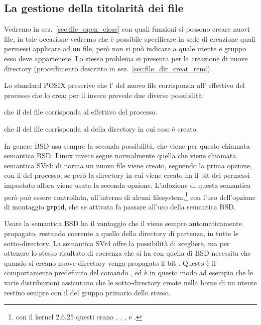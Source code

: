 

\subsection{La gestione della titolarità dei file}
\label{sec:file_ownership_management}

Vedremo in sez.~\ref{sec:file_open_close} con quali funzioni si possono creare
nuovi file, in tale occasione vedremo che è possibile specificare in sede di
creazione quali permessi applicare ad un file, però non si può indicare a
quale utente e gruppo esso deve appartenere.  Lo stesso problema si presenta
per la creazione di nuove directory (procedimento descritto in
sez.~\ref{sec:file_dir_creat_rem}).

Lo standard POSIX prescrive che l' del nuovo file corrisponda
all' effettivo del processo che lo crea; per il  invece
prevede due diverse possibilità:
\begin{itemize*}
\item che il  del file corrisponda al  effettivo del
  processo.
\item che il  del file corrisponda al  della directory in
  cui esso è creato.
\end{itemize*}

In genere BSD usa sempre la seconda possibilità, che viene per questo chiamata
semantica BSD. Linux invece segue normalmente quella che viene chiamata
semantica SVr4: di norma un nuovo file viene creato, seguendo la prima
opzione, con il  del processo, se però la directory in cui viene
creato ha il bit  dei permessi impostato allora viene usata la
seconda opzione. L'adozione di questa semantica però può essere controllata,
all'interno di alcuni filesystem,\footnote{con il kernel 2.6.25 questi erano
  , , , e .}  con l'uso dell'opzione di
montaggio \texttt{grpid}, che se attivata fa passare all'uso della semantica
BSD.

Usare la semantica BSD ha il vantaggio che il  viene sempre
automaticamente propagato, restando coerente a quello della directory di
partenza, in tutte le sotto-directory. La semantica SVr4 offre la possibilità
di scegliere, ma per ottenere lo stesso risultato di coerenza che si ha con
quella di BSD necessita che quando si creano nuove directory venga propagato
il bit . Questo è il comportamento predefinito del comando
, ed è in questo modo ad esempio che le varie distribuzioni
assicurano che le sotto-directory create nella home di un utente restino
sempre con il  del gruppo primario dello stesso.

